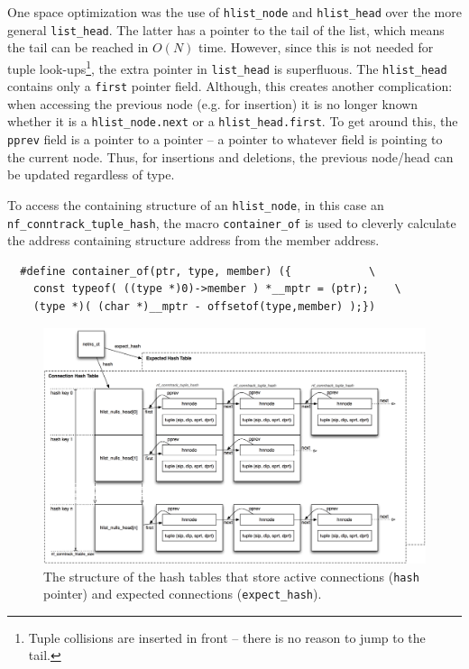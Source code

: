 \documentclass[a4paper,10pt]{article}
\newcommand{\code}[1]{\texttt{{#1}}}
\begin{document}
One space optimization was the use of
\verb|hlist_node| and \verb|hlist_head| over the more general \verb|list_head|. The
latter has a pointer to the tail of the list, which means the tail can
be reached in $O(N)$ time. However, since this is not needed for tuple
look-ups\footnote{Tuple collisions are inserted in front -- there is
  no reason to jump to the tail.}, the extra pointer in
\verb|list_head| is superfluous. The \verb|hlist_head| contains only a
\verb|first| pointer field. Although, this creates another
complication: when accessing the previous node (e.g. for insertion) it
is no longer known whether it is a \verb|hlist_node.next| or a
\verb|hlist_head.first|. To get around this, the \verb|pprev| field is
a pointer to a pointer -- a pointer to whatever field is pointing to
the current node. Thus, for insertions and deletions, the previous node/head can be
updated regardless of type.

To access the containing structure of an \verb|hlist_node|, in this
case an \verb|nf_conntrack_tuple_hash|, the macro
\verb|container_of| is used to cleverly calculate
the address containing structure address from the member address.

\begin{lstlisting}
  #define container_of(ptr, type, member) ({			\
	const typeof( ((type *)0)->member ) *__mptr = (ptr);	\
	(type *)( (char *)__mptr - offsetof(type,member) );})
\end{lstlisting}


\begin{figure}
  \centering
  \includegraphics[totalheight=0.60\textheight]{images/hash_expect_tables.png}
  \caption{The structure of the hash tables that store active
    connections (\code{hash} pointer) and expected connections
    (\code{expect\_hash}).}\label{fig:hash}
\end{figure}
\end{document}
